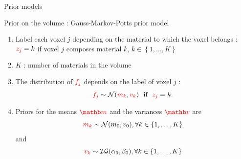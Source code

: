 \documentclass[latex]{beamer}
\def\beq{\[} \def\eeq{\]}
\begin{document}
\begin{frame}{Prior models}
\begin{block}{Prior on the volume : Gauss-Markov-Potts prior model}
\begin{enumerate}
\item Label each voxel $j$ depending on the material to which the voxel belongs : ${\color{red}z_{j}}=k$ if voxel $j$ composes material $k$, $k \in \left\{1, \dots, K\right\}$
\item $K$ : number of materials in the volume
\item The distribution of ${\color{red}f_j}$ depends on the label of voxel $j$ :
\beq
\red{f_j} \sim \Nc(\red{m_k}, \red{v_k}) \mbox{~~if~~} \red{z_j}=k.
\eeq
\item Priors for the means $\red{\mb}$ and the variances $\red{\vb}$ are
\beq
\red{m_k} \sim \Nc(m_0, v_0), \forall k \in \left\{1, \dots, K\right\}
\eeq
and
\beq
\red{v_k} \sim \Ic\Gc(\alpha_0, \beta_0), \forall k \in \left\{1, \dots, K\right\}
\eeq
\end{enumerate}
\end{block}
\end{frame}
\end{document}
